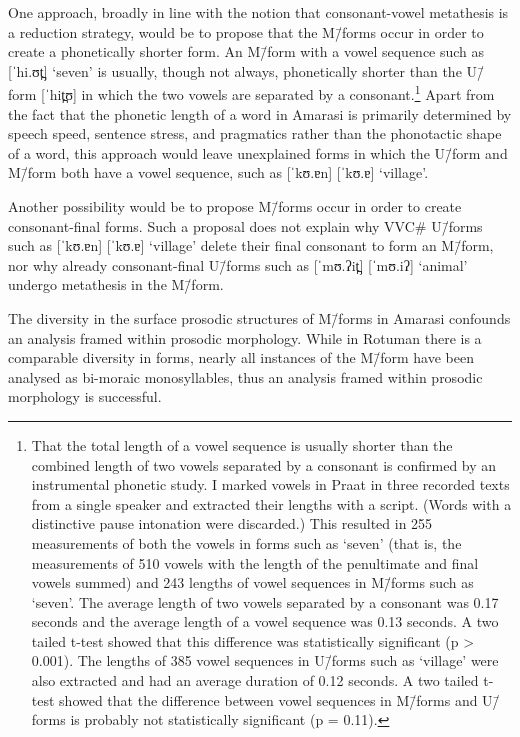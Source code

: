 One approach, broadly in line with the 
notion that consonant-vowel metathesis is a reduction strategy,
would be to propose that the M\=/forms occur in order
to create a phonetically shorter form.
An M\=/form with a vowel sequence such as  [ˈhi.ʊt̪] `seven'
is usually, though not always, phonetically shorter than the U\=/form  [ˈhit̪ʊ]
in which the two vowels are separated by a consonant.\footnote{
		That the total length of a vowel sequence is usually shorter
		than the combined length of two vowels separated by a consonant
		is confirmed by an instrumental phonetic study.
		I marked vowels in Praat in three recorded texts from a single speaker
		and extracted their lengths with a script.
		(Words with a distinctive pause intonation were discarded.)
		This resulted in 255 measurements of both the vowels in forms such as  `seven'
		(that is, the measurements of 510 vowels with the length
		of the penultimate and final vowels summed)
		and 243 lengths of vowel sequences in M\=/forms such as  `seven'.
		The average length of two vowels separated by a consonant was 0.17 seconds
		and the average length of a vowel sequence was 0.13 seconds.
		A two tailed t-test showed that this difference was statistically significant (p > 0.001).
		The lengths of 385 vowel sequences in U\=/forms such as  `village'
		were also extracted and had an average duration of 0.12 seconds.
		A two tailed t-test showed that the difference between vowel sequences
		in M\=/forms and U\=/forms is probably not statistically significant (p = 0.11).}
Apart from the fact that the phonetic length of a word in Amarasi
is primarily determined by speech speed, sentence stress, and pragmatics
rather than the phonotactic shape of a word,
this approach would leave unexplained forms in which the U\=/form
and M\=/form both have a vowel sequence, such as  [ˈkʊ.ɐn] {\ra}  [ˈkʊ.ɐ] `village'.

Another possibility would be to propose M\=/forms
occur in order to create consonant-final forms.
Such a proposal does not explain why VVC{\#} U\=/forms
such as   [ˈkʊ.ɐn] {\ra}  [ˈkʊ.ɐ] `village' delete their final consonant
to form an M\=/form, nor why already consonant-final U\=/forms
such as  [ˈmʊ.ʔit̪] {\ra}  [ˈmʊ.iʔ] `animal'
undergo metathesis in the M\=/form.

The diversity in the surface prosodic structures of M\=/forms in Amarasi
confounds an analysis framed within prosodic morphology.
While in Rotuman there is a comparable diversity in forms,
nearly all instances of the M\=/form
have been analysed as bi-moraic monosyllables,
thus an analysis framed within prosodic morphology is successful.

